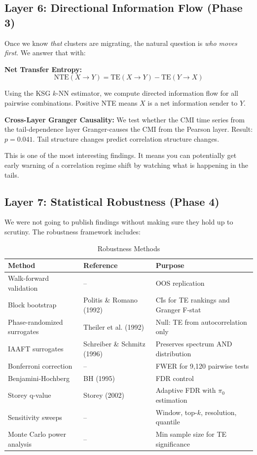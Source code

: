 \documentclass[12pt, letterpaper]{article}
\begin{document}
\subsection{Layer 6: Directional Information Flow (Phase 3)}

Once we know \textit{that} clusters are migrating, the natural question is \textit{who moves first}. We answer that with:

\textbf{Net Transfer Entropy:}
\begin{equation}
    \text{NTE}(X \to Y) = \text{TE}(X \to Y) - \text{TE}(Y \to X)
\end{equation}

Using the KSG $k$-NN estimator, we compute directed information flow for all pairwise combinations. Positive NTE means $X$ is a net information sender to $Y$.

\textbf{Cross-Layer Granger Causality:} We test whether the CMI time series from the tail-dependence layer Granger-causes the CMI from the Pearson layer. Result: $p = 0.041$. Tail structure changes predict correlation structure changes.

This is one of the most interesting findings. It means you can potentially get early warning of a correlation regime shift by watching what is happening in the tails.

\subsection{Layer 7: Statistical Robustness (Phase 4)}

We were not going to publish findings without making sure they hold up to scrutiny. The robustness framework includes:

\begin{table}[H]
\centering
\caption{Robustness Methods}
\begin{tabular}{@{}lll@{}}
\toprule
\textbf{Method} & \textbf{Reference} & \textbf{Purpose} \\
\midrule
Walk-forward validation & -- & OOS replication \\
Block bootstrap & Politis \& Romano (1992) & CIs for TE rankings and Granger F-stat \\
Phase-randomized surrogates & Theiler et al. (1992) & Null: TE from autocorrelation only \\
IAAFT surrogates & Schreiber \& Schmitz (1996) & Preserves spectrum AND distribution \\
Bonferroni correction & -- & FWER for 9,120 pairwise tests \\
Benjamini-Hochberg & BH (1995) & FDR control \\
Storey q-value & Storey (2002) & Adaptive FDR with $\pi_0$ estimation \\
Sensitivity sweeps & -- & Window, top-$k$, resolution, quantile \\
Monte Carlo power analysis & -- & Min sample size for TE significance \\
\bottomrule
\end{tabular}
\end{table}
\end{document}

